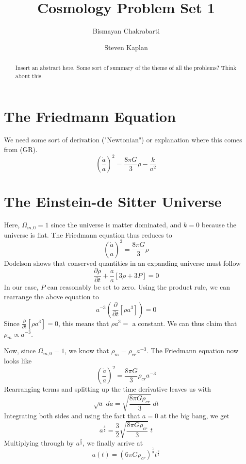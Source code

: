 \documentclass[aps,reprint,prl]{revtex4-1}
\begin{document}
\title{Cosmology Problem Set 1}
\author{Bismayan Chakrabarti}
\author{Steven Kaplan}

\begin{abstract}
Insert an abstract here. Some sort of summary of the theme of all the problems? Think about this.
\end{abstract}

\maketitle

\section*{The Friedmann Equation}
We need some sort of derivation ("Newtonian") or explanation where this comes from (GR).
\begin{equation}
\left(\frac{\dot{a}}{a}\right)^2=\frac{8\pi G}{3}\rho-\frac{k}{a^2}
\end{equation}
\section*{The Einstein-de Sitter Universe}
Here, $\Omega_{m,0}=1$ since the universe is matter dominated, and $k=0$ because the universe is flat.  The Friedmann equation thus reduces to
\begin{equation}
\left(\frac{\dot{a}}{a}\right)^2=\frac{8\pi G}{3}\rho
\end{equation}
Dodelson shows that conserved quantities in an expanding universe must follow
\begin{equation}
\frac{\partial \rho}{\partial t} + \frac{\dot{a}}{a}\left[3\rho+3P\right]=0
\end{equation}
In our case, $P$ can reasonably be set to zero.  Using the product rule, we can rearrange the above equation to
\begin{equation}
a^{-3}\left(\frac{\partial}{\partial t}\left[\rho a^3\right]\right)=0
\end{equation}
Since $\frac{\partial}{\partial t}\left[\rho a^{3}\right]=0$, this means that $\rho a^{3}=$ a constant.  We can thus claim that $\rho_m \propto a^{-3}$.

Now, since $\Omega_{m,0}=1$, we know that $\rho_m=\rho_{cr}a^{-3}$.  The Friedmann equation now looks like
$$\left(\frac{\dot{a}}{a}\right)^2=\frac{8\pi G}{3}\rho_{cr}a^{-3}$$
Rearranging terms and splitting up the time derivative leaves us with
$$\sqrt{a}\;da=\sqrt{\frac{8\pi G \rho_{cr}}{3}}\;dt$$
Integrating both sides and using the fact that $a=0$ at the big bang, we get
$$a^{\frac{3}{2}}=\frac{3}{2}\sqrt{\frac{8\pi G \rho_{cr}}{3}}\;t$$
Multiplying through by $a^{\frac{2}{3}}$, we finally arrive at
$$a(t)=\left(6\pi G\rho_{cr}\right)^{\frac{1}{3}}t^{\frac{2}{3}}$$
\end{document}
